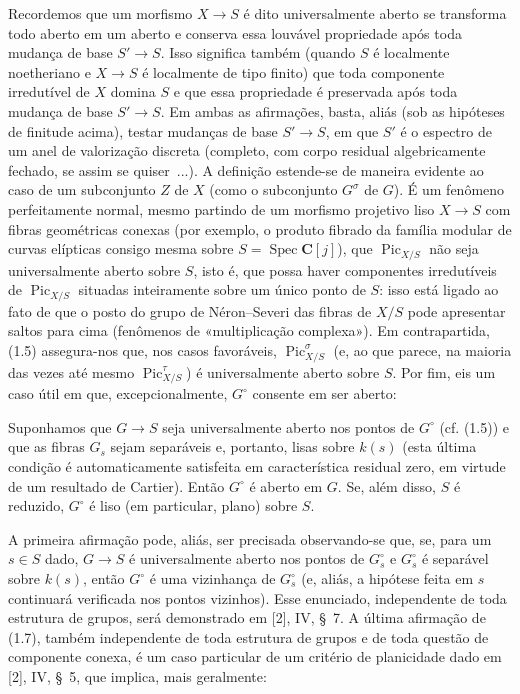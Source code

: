  Recordemos que um morfismo $X\longrightarrow S$ é
dito universalmente aberto se transforma todo aberto em um aberto e conserva
essa louvável propriedade após toda mudança de base $S'\longrightarrow S$.
Isso significa também (quando $S$ é localmente noetheriano e
$X\longrightarrow S$ é localmente de tipo finito) que toda componente
irredutível de $X$ domina $S$ e que essa propriedade é preservada após toda
mudança de base $S'\longrightarrow S$. Em ambas as afirmações, basta, aliás
(sob as hipóteses de finitude acima), testar mudanças de base
$S'\longrightarrow S$, em que $S'$ é o espectro de um anel de valorização
discreta (completo, com corpo residual algebricamente fechado, se assim se
quiser~...). A definição estende-se de maneira evidente ao caso de um
subconjunto $Z$ de $X$ (como o subconjunto $G^\sigma$ de $G$). É um fenômeno
perfeitamente normal, mesmo partindo de um morfismo projetivo liso
$X\longrightarrow S$ com fibras geométricas conexas (por exemplo, o produto
fibrado da família modular de curvas elípticas consigo mesma sobre
$S=\operatorname{Spec}\mathbf C[j]$), que $\operatorname{Pic}_{X/S}$ não
seja universalmente aberto sobre $S$, isto é, que possa haver componentes
irredutíveis de $\operatorname{Pic}_{X/S}$ situadas inteiramente sobre um
único ponto de $S$: isso está ligado ao fato de que o posto do grupo de
Néron--Severi das fibras de $X/S$ pode apresentar saltos para cima (fenômenos
de «multiplicação complexa»). Em contrapartida, (1.5) assegura-nos que, nos
casos favoráveis, $\operatorname{Pic}_{X/S}^\sigma$ (e, ao que parece, na
maioria das vezes até mesmo $\operatorname{Pic}_{X/S}^\tau$) é
universalmente aberto sobre $S$.
Por fim, eis um caso útil em que, excepcionalmente, $G^\circ$ consente em ser
aberto:

 Suponhamos que $G\longrightarrow S$ seja
universalmente aberto nos pontos de $G^\circ$ (cf. (1.5)) e que as fibras
$G_s$ sejam separáveis e, portanto, lisas sobre $k(s)$ (esta última condição é automaticamente satisfeita em
característica residual zero, em virtude de um resultado de Cartier). Então
$G^\circ$ é aberto em $G$. Se, além disso, $S$ é reduzido, $G^\circ$ é liso
(em particular, plano) sobre $S$.

A primeira afirmação pode, aliás, ser precisada observando-se que, se, para um
$s\in S$ dado, $G\longrightarrow S$ é universalmente aberto nos pontos de
$G_s^\circ$ e $G_s^\circ$ é separável sobre $k(s)$, então $G^\circ$ é uma
vizinhança de $G_s^\circ$ (e, aliás, a hipótese feita em $s$ continuará
verificada nos pontos vizinhos). Esse enunciado, independente de toda estrutura
de grupos, será demonstrado em [2], IV, §~7. A última afirmação de (1.7), também
independente de toda estrutura de grupos e de toda questão de componente
conexa, é um caso particular de um critério de planicidade dado em [2], IV, §~5,
que implica, mais geralmente:

